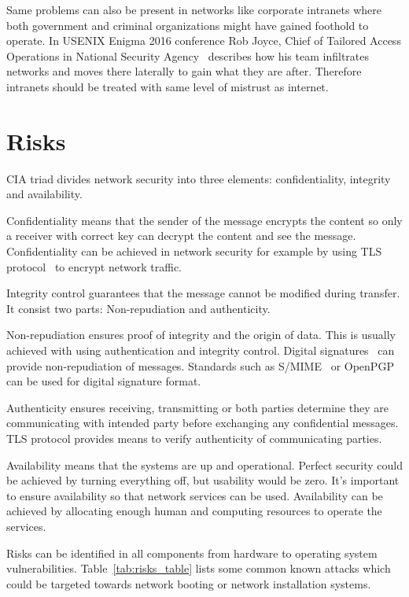 Same problems can also be present in networks like corporate intranets
where both government and criminal organizations might have gained
foothold to operate. In USENIX Enigma 2016 conference Rob Joyce, Chief
of Tailored Access Operations in National Security
Agency~\cite{nsa-tao} describes how his team infiltrates networks and
moves there laterally to gain what they are after. Therefore intranets
should be treated with same level of mistrust as internet.


\section{Risks}

CIA triad divides network security into three elements:
confidentiality, integrity and availability.

Confidentiality means that the sender of the message encrypts the
content so only a receiver with correct key can decrypt the content
and see the message. Confidentiality can be achieved in network
security for example by using TLS protocol~\cite{RFC5246} to encrypt
network traffic.

Integrity control guarantees that the message cannot be modified
during transfer. It consist two parts: Non-repudiation and
authenticity.

Non-repudiation ensures proof of integrity and the origin of
data. This is usually achieved with using authentication and integrity
control. Digital signatures~\cite{Diffie2006}\cite{Goldwasser1988}
can provide non-repudiation of messages. Standards such as
S/MIME~\cite{RFC5751} or OpenPGP~\cite{RFC4880} can be used for
digital signature format.

Authenticity ensures receiving, transmitting or both parties determine
they are communicating with intended party before exchanging any
confidential messages. TLS protocol provides means to verify
authenticity of communicating parties.

Availability means that the systems are up and operational. Perfect
security could be achieved by turning everything off, but usability
would be zero. It's important to ensure availability so that network
services can be used. Availability can be achieved by allocating
enough human and computing resources to operate the services.

Risks can be identified in all components from hardware to operating
system vulnerabilities. Table~\ref{tab:risks_table} lists some
common known attacks which could be targeted towards network booting
or network installation systems.

